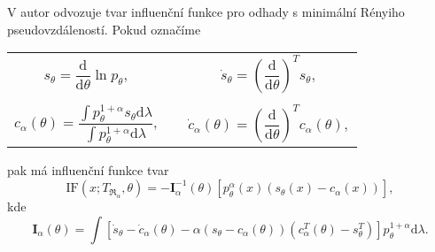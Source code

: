 V \cite{Vajda2009} autor odvozuje tvar influenční funkce pro odhady s minimální Rényiho pseudovzdáleností. Pokud označíme 
\begin{center}
	\begin{tabular}{c c}
	$s_\theta = \dfrac{\mathrm{d}}{\mathrm{d}\theta} \ln p_\theta, \quad$ & $ \dot{s}_\theta = \left( \dfrac{\mathrm{d}}{\mathrm{d}\theta} \right)^T s_\theta,$ \\ 
	&\\
	$c_\alpha(\theta) = \dfrac{\int p_\theta^{1+\alpha}s_\theta \mathrm{d}\lambda}{\int p_\theta^{1+\alpha} \mathrm{d}\lambda}, \quad$ & $\dot{c}_\alpha(\theta)= \left( \dfrac{\mathrm{d}}{\mathrm{d}\theta} \right)^T c_\alpha(\theta),$  \\ 
	\end{tabular} 
\end{center}
pak má influenční funkce tvar 
\begin{equation}
	\mathrm{IF}(x;T_{\mathfrak{R}_\alpha},\theta) = -\mathbf{I}^{-1}_{\alpha}(\theta) \left[ p_\theta^\alpha(x) (s_\theta (x) - c_\alpha (x)) \right], 
	\label{IF}
\end{equation}
kde 
\begin{equation}
\mathbf{I}_{\alpha}(\theta) = \int{ \left[\dot{s}_\theta - \dot{c}_\alpha(\theta) - \alpha(s_\theta - c_\alpha(\theta))(c^T_\alpha(\theta) - s^T_\theta) \right] p_\theta^{1+\alpha} \mathrm{d}\lambda}.
\end{equation}

